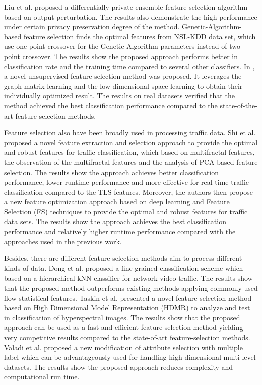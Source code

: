 \documentclass{ieeeaccess}
\theoremstyle{definition}
\begin{document}
Liu et al.\cite{Liu2018} proposed a differentially private ensemble feature selection algorithm based on output perturbation. The results also demonstrate the high performance under certain privacy preservation degree of the method. Genetic-Algorithm-based feature selection \cite{Ferriyan2017} finds the optimal features from NSL-KDD data set, which use one-point crossover for the Genetic Algorithm parameters instead of two-point crossover. The results show the proposed approach performs better in classification rate and the training time compared to several other classifiers. In \cite{Han2020}, a novel unsupervised feature selection method was proposed. It leverages the graph matrix learning and the low-dimensional space learning to obtain their individually optimized result. The results on real datasets verified that the method achieved the best classification performance compared to the state-of-the-art feature selection methods.

Feature selection also have been broadly used in processing traffic data. Shi et al.\cite{Shi2017} proposed a novel feature extraction and selection approach to provide the optimal and robust features for traffic classification, which based on multifractal features, the observation of the multifractal features and the analysis of PCA-based feature selection. The results show the approach achieves better classification performance, lower runtime performance and more effective for real-time traffic classification compared to the TLS features. Moreover, the authors then propose a new feature optimization approach based on deep learning and Feature Selection (FS) techniques\cite{Shi2018} to provide the optimal and robust features for traffic data sets. The results show the approach achieves the best classification performance and relatively higher runtime performance compared with the approaches used in the previous work.

Besides, there are different feature selection methods aim to process different kinds of data. Dong et al.\cite{Dong2017} proposed a fine grained classification scheme which based on a hierarchical kNN classifier for network video traffic. The results show that the proposed method outperforms existing methods applying commonly used flow statistical features. Taskin et al.\cite{Taskin2017} presented a novel feature-selection method based on High Dimensional Model Representation (HDMR) to analyze and test in classification of hyperspectral images. The results show that the proposed approach can be used as a fast and efficient feature-selection method yielding very competitive results compared to the state-of-art feature-selection methods. Valadi et al.\cite{Valadi2019} proposed a new modification of attribute selection with multiple label which can be advantageously used for handling high dimensional multi-level datasets. The results show the proposed approach reduces complexity and computational run time.
\end{document}
